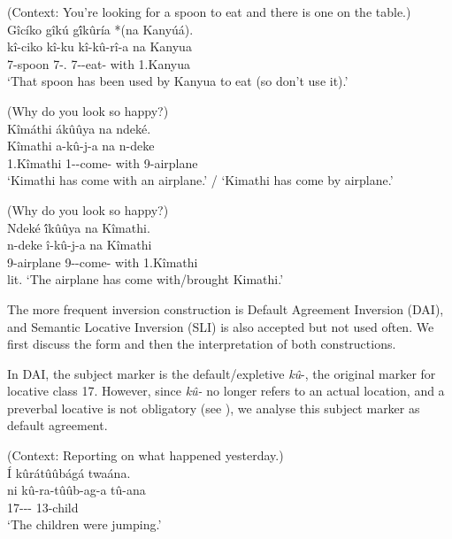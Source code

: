 \documentclass[output=paper]{langscibook}
\begin{document}
\ex
\label{bkm:Ref117502171:b}
(Context: You’re looking for a spoon to eat and there is one on the table.)\\
Gîcíko gîkú g\'{î}kûría *(na Kanyúá).\\
\gll
kî-ciko   kî-ku   kî-kû-rî-a   na   Kanyua\\
7-spoon   7-\DEM.\MED{}   7\SM{}-\PRS{}-eat-\FV{} with   1.Kanyua\\
\glt
‘That spoon has been used by Kanyua to eat (so don’t use it).’

\z
\z


\ea
\label{bkm:Ref117502173}
\ea
\label{bkm:Ref117502173:a}
(Why do you look so happy?)\\
Kîmáthi \'{a}kûûya na ndek\'{e}.\\
\gll
Kîmathi   a-kû-j-a   na   n-deke\\
1.Kîmathi 1\SM-\PRS{}-come-\FV{} with   9-airplane\\
\glt
‘Kimathi has come with an airplane.’ / ‘Kimathi has come by airplane.’

\ex
\label{bkm:Ref117502173:b}
(Why do you look so happy?)\\
Ndeké \'{î}kûûya na Kîmathi.\\
\gll
n-deke   î-kû-j-a   na   Kîmathi\\
9-airplane   9\SM{}-\PRS{}-come-\FV{} with   1.Kîmathi\\
\glt
lit. ‘The airplane  has come with/brought Kimathi.’

\z
\z

The more frequent inversion construction is Default Agreement Inversion (DAI), and Semantic Locative Inversion (SLI) is also accepted but not used often. We first discuss the form and then the interpretation of both constructions.

In DAI, the subject marker is the default/expletive \textit{kû}-, the original marker for locative class 17. However, since \textit{kû-} no longer refers to an actual location, and a preverbal locative is not obligatory (see ), we analyse this subject marker as default agreement.

\ea
(Context: Reporting on what happened yesterday.)\\
Í kûrátûûbágá twaána.\\
\gll
ni  kû-ra-tûûb-ag-a  tû-ana\\
\FOC{} 17\SM{}-\YPST-\HAB{}-\FV{} 13-child\\
\glt
‘The children were jumping.’
\end{document}
